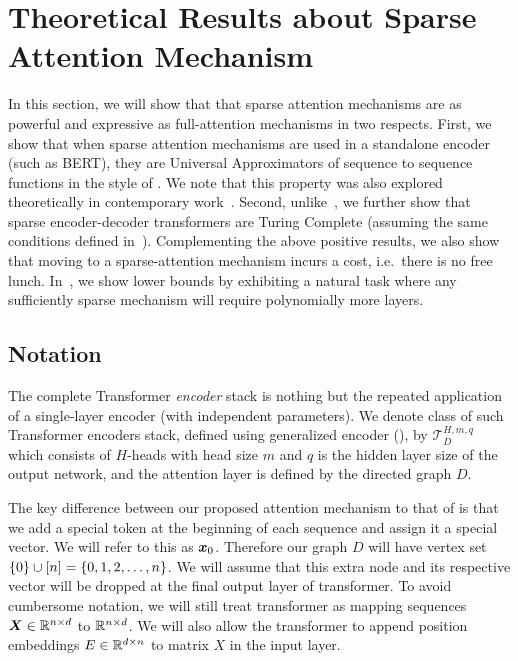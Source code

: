 \section{Theoretical Results about Sparse Attention Mechanism}
\label{sec:theory}

In this section, we will show that that sparse attention mechanisms are as 
powerful and expressive as full-attention mechanisms in two respects.
First, we show that when sparse attention mechanisms are used in a standalone encoder 
(such as BERT), they are Universal Approximators of sequence 
to sequence functions in the style of \citet{Yun19}. 
We note that this property was also explored theoretically in contemporary work~\citet{yun2020on}.
%
Second, unlike~\citep{yun2020on}, we further show that sparse encoder-decoder transformers are Turing Complete 
(assuming the same conditions defined in~\citep{Perez19}).
%
Complementing the above positive results, we also show that moving to a sparse-attention mechanism 
incurs a cost, i.e.~there is no free lunch. In~, we show lower bounds 
by exhibiting a natural task where any  sufficiently sparse  mechanism will 
require polynomially more layers. 

\subsection{Notation}
The complete Transformer {\em encoder} stack is nothing but the repeated application of a single-layer encoder (with independent parameters). 
We denote class of such Transformer encoders stack, defined using  generalized encoder (),  by $\mathcal{T}_{D}^{H,m,q}$ which consists of $H$-heads with head size $m$ and $q$ is the hidden layer size of the output network, and the attention layer is defined by the directed graph $D$. 

The key difference between our proposed attention mechanism to that of \citet{vaswani2017attention,Yun19} is that we add a special token at the beginning of each sequence and assign it a special vector. 
We will refer to this as ${\bm{x}}_0$. 
Therefore our graph $D$ will have vertex set $\{0\} \cup [n] = \{0,1,2,\dots,n\}$.
We will assume that this extra node and its respective vector will be dropped at the final output layer of transformer. 
To avoid cumbersome notation, we will still treat transformer as mapping sequences 
${\bm{X}} \in \mathbb{R}^{n \times d}$ to $\mathbb{R}^{n \times d}$. We will also allow the 
transformer to append position embeddings  $E \in \mathbb{R}^{d\times n}$ to 
matrix $X$ in the input layer. 

